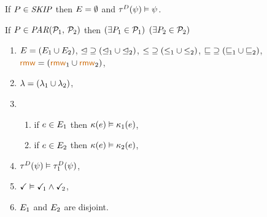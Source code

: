 \begin{definition}
  \noindent
  If $P\in\textnormal{\textit{SKIP}}$ then $E = \emptyset$ and
  $\aTr{\bEvs}{\bForm} \rimplies \bForm$.

  \noindent
  If $\aPS \in \sLPAR{\aPSS_1}{\aPSS_2}$ then  
  $(\exists P_1\in\mathcal{P}_1)$ $(\exists P_2\in\mathcal{P}_2)$
  \begin{enumerate}[topsep=0pt,label=(\textsc{p}\arabic*),ref=\textsc{p}\arabic*]
  \item \label{par-E}
    $E = (E_1\cup E_2)$,
    ${\trianglelefteq}\supseteq({\trianglelefteq_1}\cup{\trianglelefteq_2})$, 
    ${\le}\supseteq({\le_1}\cup{\le_2})$, 
    ${\sqsubseteq}\supseteq({\sqsubseteq_1}\cup{\sqsubseteq_2})$, 
    ${\rrmw}=\PBR{{\rrmw_1}\cup{\rrmw_2}}$, 
  \item \label{par-lambda}
    ${\lambda}=({\lambda_1}\cup {\lambda_2})$, 
  \item[]  
    \begin{enumerate}[leftmargin=0pt]
    \item \label{par-kappa1} if $e\in E_1$ then $\kappa(e) \mathrel{\vDash} \kappa_1(e)$,
    \item \label{par-kappa2} if $e\in E_2$ then $\kappa(e) \mathrel{\vDash} \kappa_2(e)$,
    \end{enumerate}
  \item \label{par-tau}
    $\aTr{\bEvs}{\bForm} \rimplies \aTr[1]{\bEvs}{\bForm}$,
  \item \label{par-term}
    $\aTerm \rimplies \aTerm[1]\land\aTerm[2]$,
  \item \label{par-disjoint}
    $E_1$ and $E_2$ are disjoint.
  \end{enumerate}
  \medskip


\end{definition}
